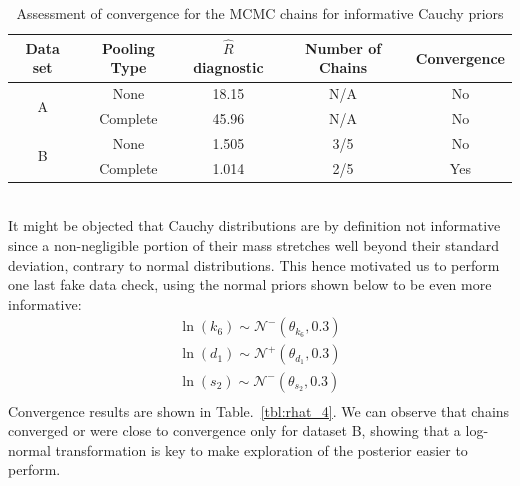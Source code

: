 \documentclass[11pt]{article}
\begin{document}
\begin{table}[!h]
    \centering
    \caption{Assessment of convergence for the MCMC chains for informative Cauchy priors}
    \begin{tabular}{c|c||c|c|c}
        \hline
        Data set & Pooling Type & $\hat{R}$ diagnostic & Number of Chains & Convergence  \\ \hline 
        \multirow{2}{*}{A}      & None  & 18.15 & N/A & No \\
                                & Complete & 45.96 & N/A & No \\ \hline 
        \multirow{2}{*}{B}      & None  & 1.505 & 3/5 & No \\
                                & Complete & 1.014 & 2/5 & Yes \\ \hline 
    \end{tabular}
    \label{tbl:rhat_3}
\end{table}
\\[12pt]
It might be objected that Cauchy distributions are by definition not informative since a non-negligible portion of their mass stretches well beyond their standard deviation, contrary to normal distributions. This hence motivated us to perform one last fake data check, using the normal priors shown below to be even more informative: 
\begin{align*}
    \ln(k_6) \sim \mathcal{N}^-(\theta_{k_6}, 0.3) \\ 
    \ln(d_1) \sim \mathcal{N}^+(\theta_{d_1}, 0.3) \\ 
    \ln(s_2) \sim \mathcal{N}^-(\theta_{s_2}, 0.3) \\ 
\end{align*}
Convergence results are shown in Table.~\ref{tbl:rhat_4}. We can observe that chains converged or were close to convergence only for dataset B, showing that a log-normal transformation is key to make exploration of the posterior easier to perform.
\end{document}
